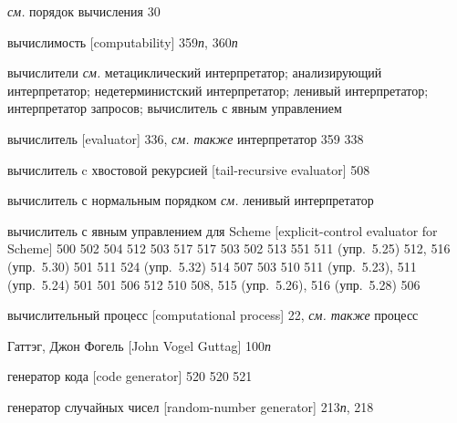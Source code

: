 \begin{theindex}
   {\it см.} порядок вычисления
   30
\item {вычислимость [computability]} 359{\it п}, 360{\it п}
\item {вычислители} {\it см.} метациклический интерпретатор; анализирующий интерпретатор; недетерминистский интерпретатор; ленивый интерпретатор; интерпретатор запросов; вычислитель с явным управлением
\item {вычислитель [evaluator]} 336, {\it см. также} интерпретатор
   359
   338
\item {вычислитель c хвостовой рекурсией [tail-recursive evaluator]} 508
\item {вычислитель с нормальным порядком} {\it см.} ленивый интерпретатор
\item {вычислитель с явным управлением для Scheme [explicit-control evaluator for Scheme]} 500
   502
   504
   512
   503
   517
   517
   503
   502
   513
   551
   511 (упр.~5.25)
   512, 516 (упр.~5.30)
   501
   511
   524 (упр.~5.32)
   514
   507
   503
   510
   511 (упр.~5.23), 511 (упр.~5.24)
   501
   501
   506
   512
   510
   508, 515 (упр.~5.26), 516 (упр.~5.28)
   506
\item {вычислительный процесс [computational process]} 22, {\it см. также} процесс
\bigskip
\item {Гаттэг, Джон Фогель [John Vogel Guttag]} 100{\it п}
\item {генератор кода [code generator]} 520
   520
   521
\item {генератор случайных чисел [random-number generator]} 213{\it п}, 218

\end{theindex}
